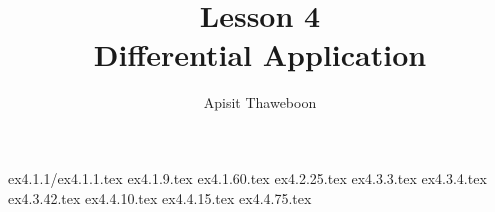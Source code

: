 \documentclass{article}
\title{%
    Lesson 4 \: \\
    \large Differential Application
}
\author{Apisit Thaweboon \: 65050988}
\date{}
\begin{document}
\maketitle
{ex4.1.1/ex4.1.1.tex}
{ex4.1.9.tex}
{ex4.1.60.tex}
{ex4.2.25.tex}
{ex4.3.3.tex}
{ex4.3.4.tex}
{ex4.3.42.tex}
{ex4.4.10.tex}
{ex4.4.15.tex}
{ex4.4.75.tex}





\end{document}
